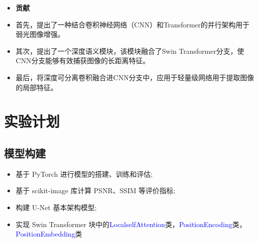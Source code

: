 \documentclass[CJK,aspectratio=169]{beamer}  %
\begin{document}
	\begin{frame}
		
		\begin{itemize}
			\item \textbf{贡献}
			
			\item[\checkmark] 首先，提出了一种结合卷积神经网络（CNN）和Transformer的并行架构用于弱光图像增强。
			
			\vspace{.3cm}
			\item[\checkmark] 其次，提出了一个深度语义模块，该模块融合了Swin Transformer分支，使CNN分支能够有效捕获图像的长距离特征。
			
			
			\vspace{.3cm}
			\item[\checkmark] 最后，将深度可分离卷积融合进CNN分支中，应用于轻量级网络用于提取图像的局部特征。
		\end{itemize}	
		
	\end{frame}
	
	\section{实验计划}
	\subsection{模型构建}
	
	\begin{frame}
		
		\begin{itemize}
			\item 基于 PyTorch 进行模型的搭建、训练和评估;
			
			\item 基于 scikit-image 库计算 PSNR、SSIM 等评价指标;
		
			\item 构建 U-Net 基本架构模型;
			
			\item 实现 Swin Transformer 块中的\textcolor{blue}{LocalselfAttention}类，\textcolor{blue}{PositionEncoding}类，\textcolor{blue}{PositionEmbedding}类
		\end{itemize}

	\end{frame}
	
\end{document}
